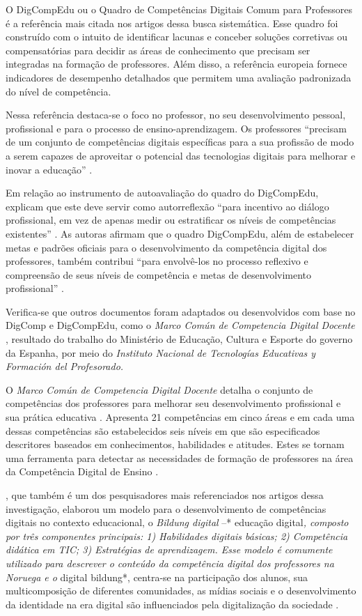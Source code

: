 \documentclass[portuguese]{textolivre}
\begin{document}
O DigCompEdu \cite{redecker2017} ou o Quadro de Competências Digitais
Comum para Professores é a referência mais citada nos artigos dessa
busca sistemática. Esse quadro foi construído com o intuito de
identificar lacunas e conceber soluções corretivas ou compensatórias
para decidir as áreas de conhecimento que precisam ser integradas na
formação de professores. Além disso, a referência europeia fornece
indicadores de desempenho detalhados que permitem uma avaliação
padronizada do nível de competência.

Nessa referência destaca-se o foco no professor, no seu desenvolvimento
pessoal, profissional e para o processo de ensino-aprendizagem. Os
professores ``precisam de um conjunto de competências digitais
específicas para a sua profissão de modo a serem capazes de aproveitar o
potencial das tecnologias digitais para melhorar e inovar a educação''
\cite[p.~8]{lucas2018}.

Em relação ao instrumento de autoavaliação do quadro do DigCompEdu,
\textcite{caena2019} explicam que este deve servir como autorreflexão
``para incentivo ao diálogo profissional, em vez de apenas medir ou
estratificar os níveis de competências existentes''
\cite[p.~366]{caena2019}. As autoras afirmam que o quadro
DigCompEdu, além de estabelecer metas e padrões oficiais para o
desenvolvimento da competência digital dos professores, também contribui
``para envolvê-los no processo reflexivo e compreensão de seus níveis de
competência e metas de desenvolvimento profissional''
\cite[p.~367]{caena2019}.

Verifica-se que outros documentos foram adaptados ou desenvolvidos com
base no DigComp e DigCompEdu, como o \emph{Marco Común de Competencia
Digital Docente} \cite{intef2017}, resultado do trabalho do Ministério
de Educação, Cultura e Esporte do governo da Espanha, por meio do
\emph{Instituto Nacional de Tecnologías Educativas y Formación del
Profesorado.}

O \emph{Marco Común de Competencia Digital Docente} detalha o conjunto
de competências dos professores para melhorar seu desenvolvimento
profissional e sua prática educativa \cite{intef2017}. Apresenta 21
competências em cinco áreas e em cada uma dessas competências são
estabelecidos seis níveis em que são especificados descritores baseados
em conhecimentos, habilidades e atitudes. Estes se tornam uma ferramenta
para detectar as necessidades de formação de professores na área da
Competência Digital de Ensino \cite{intef2017}.

\textcite{krumsvik2009}, que também é um dos pesquisadores mais referenciados
nos artigos dessa investigação, elaborou um modelo para o
desenvolvimento de competências digitais no contexto educacional, o
\emph{Bildung digital} --* educação digital\emph{, composto por três
componentes principais: 1) Habilidades digitais básicas; 2) Competência
didática em TIC; 3) Estratégias de aprendizagem. Esse modelo é comumente
utilizado para descrever o conteúdo da competência digital dos
professores na Noruega e o }digital bildung*, centra-se na participação
dos alunos, sua multicomposição de diferentes comunidades, as mídias
sociais e o desenvolvimento da identidade na era digital são
influenciados pela digitalização da sociedade \cite{krumsvik2009}.
\end{document}

